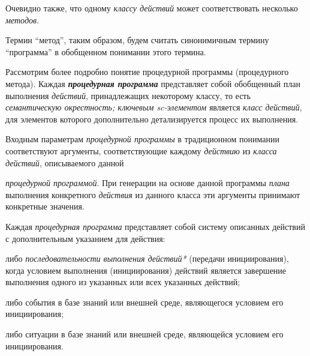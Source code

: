 Очевидно также, что одному \textit{классу действий} может соответствовать несколько \textit{методов}.

Термин ``метод'', таким образом, будем считать синонимичным термину ``программа'' в обобщенном понимании этого термина.

\begin{SCn}
	\begin{scnindent}
	\end{scnindent}
\end{SCn}

Рассмотрим более подробно понятие процедурной программы (процедурного метода). Каждая \textbf{\textit{процедурная программа}} представляет собой обобщенный план выполнения \textit{действий}, принадлежащих некоторому классу, то есть \textit{семантическую окрестность; ключевым sc-элементом\scnrolesign} является \textit{класс действий}, для элементов которого дополнительно детализируется процесс их выполнения.

Входным параметрам \textit{процедурной программы} в традиционном понимании соответствуют аргументы, соответствующие каждому \textit{действию} из \textit{класса действий}, описываемого данной {\textit{процедурной программой}. При генерации на основе данной программы \textit{плана} выполнения конкретного \textit{действия} из данного класса эти аргументы принимают конкретные значения.

Каждая \textit{процедурная программа} представляет собой систему описанных действий с дополнительным указанием для действия:
\begin{textitemize}
	\item либо \textit{последовательности выполнения действий*} (передачи инициирования), когда условием выполнения (инициирования) действий является завершение выполнения одного из указанных или всех указанных действий;
	\item либо события в базе знаний или внешней среде, являющегося условием его инициирования;
	\item либо ситуации в базе знаний или внешней среде, являющейся условием его инициирования.
\end{textitemize}
}

